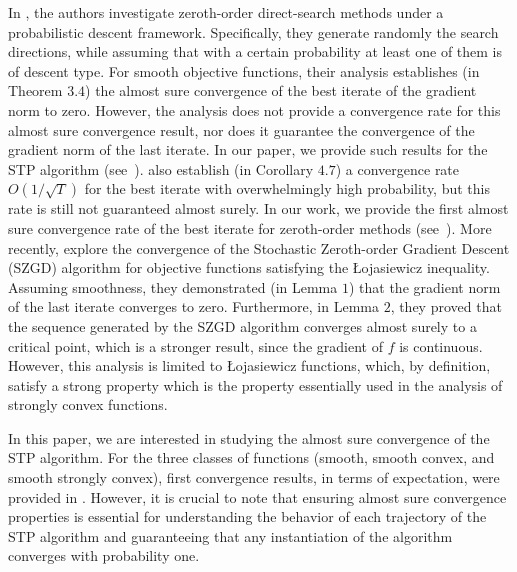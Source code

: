 \documentclass{article} %
\begin{document}
In \citep{doi:10.1137/140961602}, the authors investigate zeroth-order direct-search methods under a probabilistic descent framework. Specifically, they generate randomly the search directions, while assuming that with a certain probability at least one of them is of descent type. For smooth objective functions, their analysis establishes (in Theorem $3.4$) the almost sure convergence of the best iterate of the gradient norm to zero. However, the analysis does not provide a convergence rate for this almost sure convergence result, nor does it guarantee the convergence of the gradient norm of the last iterate. In our paper, we provide such results for the STP algorithm (see~). 
\citep{doi:10.1137/140961602} also establish (in Corollary $4.7$) a convergence rate $O(1/\sqrt{T})$ for the best iterate with overwhelmingly high probability, but this rate is still not guaranteed almost surely. In our work, we provide the first almost sure convergence rate of the best iterate for zeroth-order methods (see~). 
More recently, \cite{wang2022convergence} explore the convergence of the Stochastic Zeroth-order Gradient Descent (SZGD) algorithm for objective functions satisfying the \L{}ojasiewicz inequality. Assuming smoothness, they demonstrated (in Lemma $1$) that the gradient norm of the last iterate converges to zero. Furthermore, in Lemma $2$, they proved that the sequence generated by the SZGD algorithm converges almost surely to a critical point, which is a stronger result, since the gradient of $f$ is continuous. However, this analysis is limited to \L{}ojasiewicz functions, which, by definition, satisfy a strong property which is the property essentially used in the analysis of strongly convex functions.

In this paper, we are interested in studying the almost sure convergence of the STP algorithm. For the three classes of functions (smooth, smooth convex, and smooth strongly convex),
first convergence results, in terms of expectation, were provided in \cite{bergou2020stochastic}. However,
it is crucial to note that ensuring almost sure convergence properties is essential for understanding
the behavior of each trajectory of the STP algorithm and guaranteeing that any instantiation of the
algorithm converges with probability one.




\end{document}
